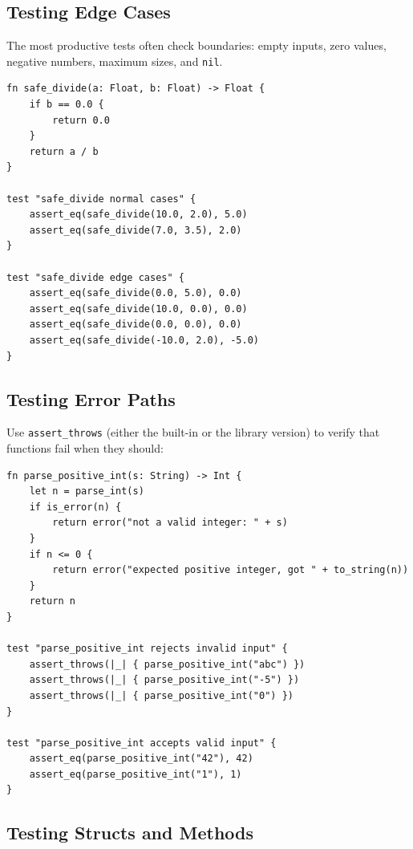 \subsection{Testing Edge Cases}\label{sec:edge-cases}

The most productive tests often check boundaries: empty inputs, zero values, negative numbers, maximum sizes, and \lstinline|nil|.

\begin{lstlisting}[language=Lattice, caption={Testing edge cases}]
fn safe_divide(a: Float, b: Float) -> Float {
    if b == 0.0 {
        return 0.0
    }
    return a / b
}

test "safe_divide normal cases" {
    assert_eq(safe_divide(10.0, 2.0), 5.0)
    assert_eq(safe_divide(7.0, 3.5), 2.0)
}

test "safe_divide edge cases" {
    assert_eq(safe_divide(0.0, 5.0), 0.0)
    assert_eq(safe_divide(10.0, 0.0), 0.0)
    assert_eq(safe_divide(0.0, 0.0), 0.0)
    assert_eq(safe_divide(-10.0, 2.0), -5.0)
}
\end{lstlisting}

\subsection{Testing Error Paths}\label{sec:testing-errors}

Use \lstinline|assert_throws| (either the built-in or the library version) to verify that functions fail when they should:

\begin{lstlisting}[language=Lattice, caption={Testing that errors are thrown correctly}]
fn parse_positive_int(s: String) -> Int {
    let n = parse_int(s)
    if is_error(n) {
        return error("not a valid integer: " + s)
    }
    if n <= 0 {
        return error("expected positive integer, got " + to_string(n))
    }
    return n
}

test "parse_positive_int rejects invalid input" {
    assert_throws(|_| { parse_positive_int("abc") })
    assert_throws(|_| { parse_positive_int("-5") })
    assert_throws(|_| { parse_positive_int("0") })
}

test "parse_positive_int accepts valid input" {
    assert_eq(parse_positive_int("42"), 42)
    assert_eq(parse_positive_int("1"), 1)
}
\end{lstlisting}

\subsection{Testing Structs and Methods}\label{sec:testing-structs}

